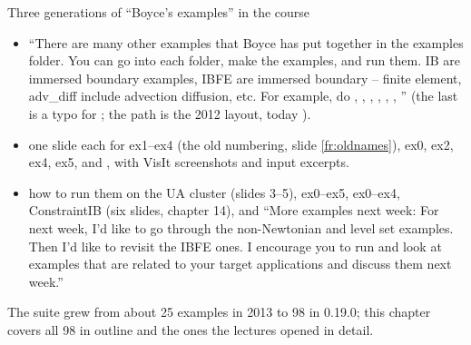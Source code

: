 \documentclass[aspectratio=169,11pt]{beamer}
\begin{document}
\begin{frame}{Three generations of ``Boyce's examples'' in the course}
\label{fr:gens}
\footnotesize
\begin{itemize}
  \item {} ``There are many other examples that Boyce has put together in the examples folder. You can go into each folder, make the examples, and run them. IB are immersed boundary examples, IBFE are immersed boundary -- finite element, adv\_diff include advection diffusion, etc. For example, do , , , , , , '' (the last is a typo for ; the path  is the 2012 layout, today ).
  \item {} one slide each for  ex1--ex4 (the old numbering, slide \ref{fr:oldnames}),  ex0, ex2, ex4, ex5,  and , with VisIt screenshots and input excerpts.
  \item {} how to run them on the UA cluster (slides 3--5),  ex0--ex5,  ex0--ex4, ConstraintIB (six slides, chapter 14), and ``More examples next week: For next week, I'd like to go through the non-Newtonian and level set examples. Then I'd like to revisit the IBFE ones. I encourage you to run and look at examples that are related to your target applications and discuss them next week.''
\end{itemize}
\begin{punchbox}
\footnotesize The suite grew from about 25 examples in 2013 to 98 in 0.19.0; this chapter covers all 98 in outline and the ones the lectures opened in detail.
\end{punchbox}
\end{frame}
\end{document}
